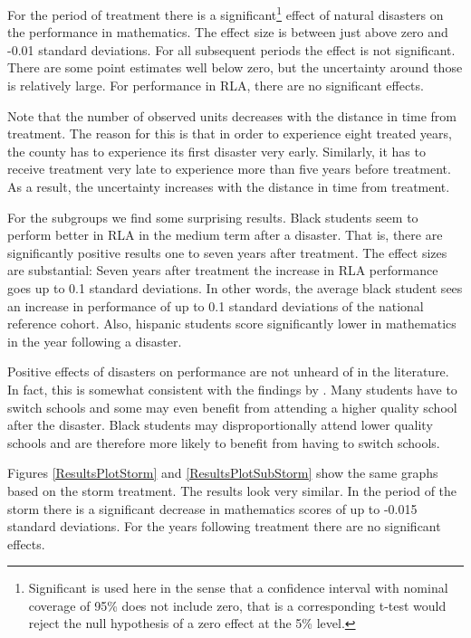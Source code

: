 For the period of treatment there is a significant\footnote{Significant is used here in the sense that a confidence interval with nominal coverage of 95\% does not include zero, that is a corresponding t-test would reject the null hypothesis of a zero effect at the 5\% level.} effect of natural disasters on the performance in mathematics. The effect size is between just above zero and -0.01 standard deviations. For all subsequent periods the effect is not significant. There are some point estimates well below zero, but the uncertainty around those is relatively large. For performance in RLA, there are no significant effects.

Note that the number of observed units decreases with the distance in time from treatment. The reason for this is that in order to experience eight treated years, the county has to experience its first disaster very early. Similarly, it has to receive treatment very late to experience more than five years before treatment. As a result, the uncertainty increases with the distance in time from treatment.

For the subgroups we find some surprising results. Black students seem to perform better in RLA in the medium term after a disaster. That is, there are significantly positive results one to seven years after treatment. The effect sizes are substantial: Seven years after treatment the increase in RLA performance goes up to 0.1 standard deviations. In other words, the average black student sees an increase in performance of up to 0.1 standard deviations of the national reference cohort. Also, hispanic students score significantly lower in mathematics in the year following a disaster.



Positive effects of disasters on performance are not unheard of in the literature. In fact, this is somewhat consistent with the findings by \cite{Sacerdote_2012}. Many students have to switch schools and some may even benefit from attending a higher quality school after the disaster. Black students may disproportionally attend lower quality schools and are therefore more likely to benefit from having to switch schools. 

Figures \ref{ResultsPlotStorm} and \ref{ResultsPlotSubStorm} show the same graphs based on the storm treatment. The results look very similar. In the period of the storm there is a significant decrease in mathematics scores of up to -0.015 standard deviations. For the years following treatment there are no significant effects.

